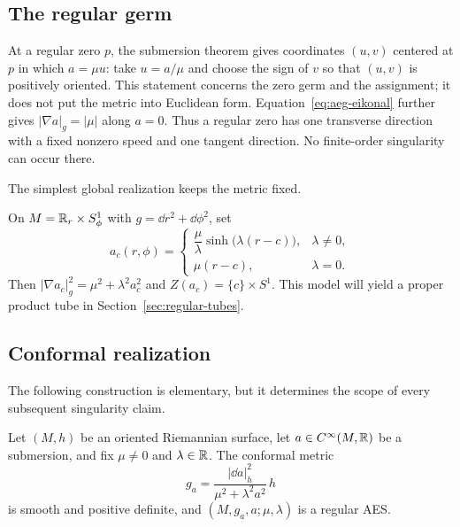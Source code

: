 \subsection{The regular germ}

At a regular zero $p$, the submersion theorem gives coordinates $(u,v)$ centered
at $p$ in which $a=\mu u$: take $u=a/\mu$ and choose the sign of $v$ so that
$(u,v)$ is positively oriented.
This statement concerns the zero germ and the assignment; it does not put the
metric into Euclidean form.  Equation~\eqref{eq:aeg-eikonal} further gives
$|\nabla a|_g=|\mu|$ along $a=0$.  Thus a regular zero has one transverse
direction with a fixed nonzero speed and one tangent direction.  No finite-order
singularity can occur there.

The simplest global realization keeps the metric fixed.

\begin{example}
\label{ex:cylindrical-propagation}
On $M=\mathbb{R}_r\times S^1_\phi$ with $g=\dd r^2+\dd\phi^2$, set
\[
 a_c(r,\phi)=
 \begin{cases}
  \dfrac{\mu}{\lambda}\sinh\!\bigl(\lambda(r-c)\bigr),&\lambda\ne0,\\[6pt]
  \mu(r-c),&\lambda=0.
 \end{cases}
\]
Then $|\nabla a_c|_g^2=\mu^2+\lambda^2a_c^2$ and
$Z(a_c)=\{c\}\times S^1$.  This model will yield a proper product tube in
Section~\ref{sec:regular-tubes}.
\end{example}

\subsection{Conformal realization}

The following construction is elementary, but it determines the scope of every
subsequent singularity claim.

\begin{theorem}
\label{thm:conformal-realization}
Let $(M,h)$ be an oriented Riemannian surface, let $a\in C^\infty(M,\mathbb{R})$ be a
submersion, and fix $\mu\ne0$ and $\lambda\in\mathbb{R}$.  The conformal metric
\begin{equation}
 g_a=\frac{|\dd a|_h^2}{\mu^2+\lambda^2a^2}\,h
 \label{eq:conformal-realization-metric}
\end{equation}
is smooth and positive definite, and $(M,g_a,a;\mu,\lambda)$ is a regular AES.
\end{theorem}

